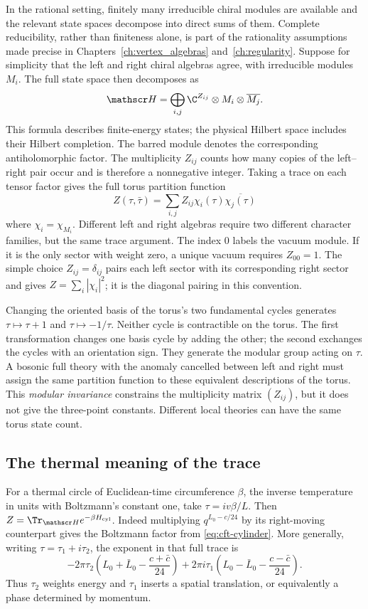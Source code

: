 In the rational setting, finitely many irreducible chiral modules
are available and the relevant state spaces decompose into direct
sums of them. Complete reducibility, rather than finiteness alone,
is part of the rationality assumptions made precise in
Chapters~\ref{ch:vertex_algebras} and~\ref{ch:regularity}. Suppose
for simplicity that the left and right chiral algebras agree, with
irreducible modules $M_i$. The full state space then decomposes as
\[
 \mathscr H=\bigoplus_{i,j}\C^{Z_{ij}}\otimes
                          M_i\otimes\overline{M_j}.
\]
This formula describes finite-energy states; the physical Hilbert
space includes their Hilbert completion. The barred module denotes
the corresponding antiholomorphic factor. The multiplicity $Z_{ij}$
counts how many copies of the left--right pair occur and is therefore
a nonnegative integer. Taking a trace on each tensor factor gives
the full torus partition function
\[
 Z(\tau,\bar\tau)=\sum_{i,j}Z_{ij}
      \chi_i(\tau)\overline{\chi_j(\tau)}
\]
where $\chi_i=\chi_{M_i}$. Different left and right algebras require
two different character families, but the same trace argument.
The index $0$ labels the vacuum module. If it is the only sector
with weight zero, a unique vacuum requires $Z_{00}=1$.
The simple choice $Z_{ij}=\delta_{ij}$ pairs each left sector with
its corresponding right sector and gives
$Z=\sum_i|\chi_i|^2$; it is the diagonal pairing in this convention.

Changing the oriented basis of the torus's two fundamental cycles
generates $\tau\mapsto\tau+1$ and $\tau\mapsto-1/\tau$.
Neither cycle is contractible on the torus. The first transformation
changes one basis cycle by adding the other; the second exchanges
the cycles with an orientation sign. They generate the modular
group acting on $\tau$. A bosonic full theory with the anomaly
cancelled between left and right must assign the same partition
function to these equivalent descriptions of the torus. This
\emph{modular invariance} constrains the multiplicity matrix
$(Z_{ij})$, but it does not give the three-point constants.
Different local theories can have the same torus state count.

\subsection{The thermal meaning of the trace}

For a thermal circle of Euclidean-time circumference $\beta$, the
inverse temperature in units with Boltzmann's constant one, take
$\tau=iv\beta/L$. Then
$Z=\Tr_{\mathscr H}e^{-\beta H_{\rm cyl}}$.
Indeed multiplying $q^{L_0-c/24}$ by its right-moving counterpart
gives the Boltzmann factor from \eqref{eq:cft-cylinder}. More generally,
writing $\tau=\tau_1+i\tau_2$, the exponent in that full trace is
\[
 -2\pi\tau_2\left(L_0+\bar L_0-\frac{c+\bar c}{24}\right)
 +2\pi i\tau_1\left(L_0-\bar L_0-\frac{c-\bar c}{24}\right).
\]
Thus $\tau_2$ weights energy and $\tau_1$ inserts a spatial
translation, or equivalently a phase determined by momentum.

